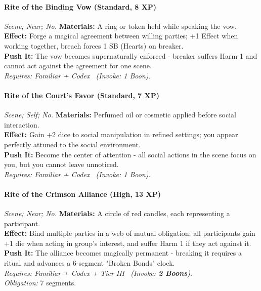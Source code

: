 \paragraph{Rite of the Binding Vow (Standard, 8 XP)} \emph{Scene; Near; No.}
\textbf{Materials:} A ring or token held while speaking the vow. \\
\textbf{Effect:} Forge a magical agreement between willing parties; +1 Effect when working together, breach forces 1 SB (Hearts) on breaker. \\
\textbf{Push It:} The vow becomes supernaturally enforced - breaker suffers Harm 1 and cannot act against the agreement for one scene. \\
\emph{Requires: Familiar + Codex \ (\textit{Invoke:} 1 Boon).}

\paragraph{Rite of the Court's Favor (Standard, 7 XP)} \emph{Scene; Self; No.}
\textbf{Materials:} Perfumed oil or cosmetic applied before social interaction. \\
\textbf{Effect:} Gain +2 dice to social manipulation in refined settings; you appear perfectly attuned to the social environment. \\
\textbf{Push It:} Become the center of attention - all social actions in the scene focus on you, but you cannot leave unnoticed. \\
\emph{Requires: Familiar + Codex \ (\textit{Invoke:} 1 Boon).}

\paragraph{Rite of the Crimson Alliance (High, 13 XP)} \emph{Scene; Near; No.}
\textbf{Materials:} A circle of red candles, each representing a participant. \\
\textbf{Effect:} Bind multiple parties in a web of mutual obligation; all participants gain +1 die when acting in group's interest, and suffer Harm 1 if they act against it. \\
\textbf{Push It:} The alliance becomes magically permanent - breaking it requires a ritual and advances a 6-segment "Broken Bonds" clock. \\
\emph{Requires: Familiar + Codex + Tier III \ (\textit{Invoke:} \textbf{2 Boons}).} \\
\emph{Obligation:} 7 segments.

